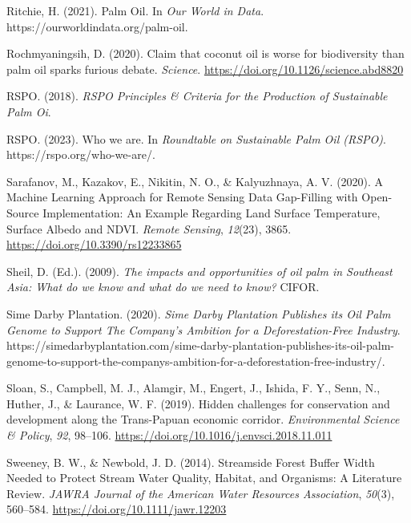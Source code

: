 \documentclass[
  letterpaper,
  DIV=11,
  numbers=noendperiod]{scrreprt}
\newlength{\cslhangindent}
\newlength{\cslentryspacingunit} %
\newenvironment{CSLReferences}[2] %
 {%
  \setlength{\parindent}{0pt}
  \ifodd #1
  \let\oldpar\par
  \def\par{\hangindent=\cslhangindent\oldpar}
  \fi
  \setlength{\parskip}{#2\cslentryspacingunit}
 }%
 {}
\begin{document}
\begin{CSLReferences}{1}{0}
\leavevmode{}%
Ritchie, H. (2021). Palm {Oil}. In \emph{Our World in Data}.
https://ourworldindata.org/palm-oil.

\leavevmode{}%
Rochmyaningsih, D. (2020). Claim that coconut oil is worse for
biodiversity than palm oil sparks furious debate. \emph{Science}.
\url{https://doi.org/10.1126/science.abd8820}

\leavevmode{}%
RSPO. (2018). \emph{{RSPO Principles} \& {Criteria} for the {Production}
of {Sustainable Palm Oi}}.

\leavevmode{}%
RSPO. (2023). Who we are. In \emph{Roundtable on Sustainable Palm Oil
(RSPO)}. https://rspo.org/who-we-are/.

\leavevmode{}%
Sarafanov, M., Kazakov, E., Nikitin, N. O., \& Kalyuzhnaya, A. V.
(2020). A {Machine Learning Approach} for {Remote Sensing Data
Gap-Filling} with {Open-Source Implementation}: {An Example Regarding
Land Surface Temperature}, {Surface Albedo} and {NDVI}. \emph{Remote
Sensing}, \emph{12}(23), 3865. \url{https://doi.org/10.3390/rs12233865}

\leavevmode{}%
Sheil, D. (Ed.). (2009). \emph{The impacts and opportunities of oil palm
in {Southeast Asia}: What do we know and what do we need to know?}
{CIFOR}.

\leavevmode{}%
Sime Darby Plantation. (2020). \emph{Sime {Darby Plantation Publishes}
its {Oil Palm Genome} to {Support The Company}'s {Ambition} for a
{Deforestation-Free Industry}}.
https://simedarbyplantation.com/sime-darby-plantation-publishes-its-oil-palm-genome-to-support-the-companys-ambition-for-a-deforestation-free-industry/.

\leavevmode{}%
Sloan, S., Campbell, M. J., Alamgir, M., Engert, J., Ishida, F. Y.,
Senn, N., Huther, J., \& Laurance, W. F. (2019). Hidden challenges for
conservation and development along the {Trans-Papuan} economic corridor.
\emph{Environmental Science \& Policy}, \emph{92}, 98--106.
\url{https://doi.org/10.1016/j.envsci.2018.11.011}

\leavevmode{}%
Sweeney, B. W., \& Newbold, J. D. (2014). Streamside {Forest Buffer
Width Needed} to {Protect Stream Water Quality}, {Habitat}, and
{Organisms}: {A Literature Review}. \emph{JAWRA Journal of the American
Water Resources Association}, \emph{50}(3), 560--584.
\url{https://doi.org/10.1111/jawr.12203}


\end{CSLReferences}
\end{document}
